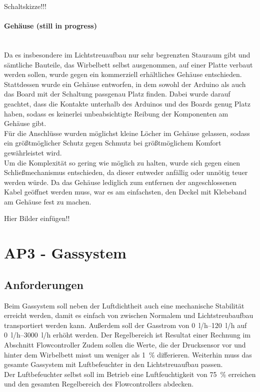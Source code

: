 Schaltskizze!!!

\paragraph{Gehäuse (still in progress)} 
\hfill \\
Da es insbesondere im Lichtstreuaufbau nur sehr begrenzten Stauraum gibt und sämtliche Bauteile, das Wirbelbett selbst ausgenommen, auf einer Platte verbaut werden sollen, wurde gegen ein kommerziell erhältliches Gehäuse entschieden. \\ 
Stattdessen wurde ein Gehäuse entworfen, in dem sowohl der Arduino als auch das Board mit der Schaltung passgenau Platz finden. Dabei wurde darauf geachtet, dass die Kontakte unterhalb des Arduinos und des Boards genug Platz haben, sodass es keinerlei unbeabsichtigte Reibung der Komponenten am Gehäuse gibt. \\
Für die Anschlüsse wurden möglichst kleine Löcher im Gehäuse gelassen, sodass ein größtmöglicher Schutz gegen Schmutz bei größtmöglichem Komfort gewährleistet wird. \\
Um die Komplexität so gering wie möglich zu halten, wurde sich gegen einen Schließmechanismus entschieden, da dieser entweder anfällig oder unnötig teuer werden würde. Da das Gehäuse lediglich zum entfernen der angeschlossenen Kabel geöffnet werden muss, war es am einfachsten, den Deckel mit Klebeband am Gehäuse fest zu machen.

Hier Bilder einfügen!!

\newpage

\section{AP3 - Gassystem}

\subsection{Anforderungen}

Beim Gassystem soll neben der Luftdichtheit auch eine mechanische Stabilität erreicht werden, damit es einfach von zwischen Normalem und Lichtstreubaufbau transportiert werden kann. Außerdem soll der Gasstrom von \SIrange{0}{120}{l/h} auf \SIrange{0}{3000}{l/h} erhöht werden. Der Regelbereich ist Resultat einer Rechnung im Abschnitt Flowcontroller Zudem sollen die Werte, die der Drucksensor vor und hinter dem Wirbelbett misst um weniger als \SI{1}{\%} differieren. Weiterhin muss das gesamte Gassystem mit Luftbefeuchter in den Lichtstreuaufbau passen. \\
Der Luftbefeuchter selbst soll im Betrieb eine Luftfeuchtigkeit von \SI{75}{\%} erreichen und den gesamten Regelbereich des Flowcontrollers abdecken.



